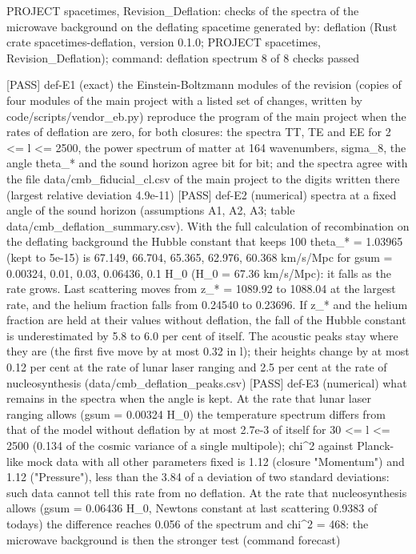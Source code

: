 \documentclass[
  10pt,
]{article}
\newenvironment{Shaded}{}{}
\newcommand{\NormalTok}[1]{#1}
\begin{document}
\begin{Shaded}
\begin{Highlighting}[]
\NormalTok{PROJECT spacetimes, Revision\_Deflation: checks of the spectra of the microwave background on the deflating spacetime}
\NormalTok{generated by: deflation (Rust crate spacetimes{-}deflation, version 0.1.0; PROJECT spacetimes, Revision\_Deflation); command: deflation spectrum}
\NormalTok{8 of 8 checks passed}

\NormalTok{[PASS] def{-}E1  (exact) the Einstein{-}Boltzmann modules of the revision (copies of four modules of the main project with a listed set of changes, written by code/scripts/vendor\_eb.py) reproduce the program of the main project when the rates of deflation are zero, for both closures: the spectra TT, TE and EE for 2 \textless{}= l \textless{}= 2500, the power spectrum of matter at 164 wavenumbers, sigma\_8, the angle theta\_* and the sound horizon agree bit for bit; and the spectra agree with the file data/cmb\_fiducial\_cl.csv of the main project to the digits written there (largest relative deviation 4.9e{-}11)}
\NormalTok{[PASS] def{-}E2  (numerical) spectra at a fixed angle of the sound horizon (assumptions A1, A2, A3; table data/cmb\_deflation\_summary.csv). With the full calculation of recombination on the deflating background the Hubble constant that keeps 100 theta\_* = 1.03965 (kept to 5e{-}15) is 67.149, 66.704, 65.365, 62.976, 60.368 km/s/Mpc for gsum = 0.00324, 0.01, 0.03, 0.06436, 0.1 H\_0 (H\_0 = 67.36 km/s/Mpc): it falls as the rate grows. Last scattering moves from z\_* = 1089.92 to 1088.04 at the largest rate, and the helium fraction falls from 0.24540 to 0.23696. If z\_* and the helium fraction are held at their values without deflation, the fall of the Hubble constant is underestimated by 5.8 to 6.0 per cent of itself. The acoustic peaks stay where they are (the first five move by at most 0.32 in l); their heights change by at most 0.12 per cent at the rate of lunar laser ranging and 2.5 per cent at the rate of nucleosynthesis (data/cmb\_deflation\_peaks.csv)}
\NormalTok{[PASS] def{-}E3  (numerical) what remains in the spectra when the angle is kept. At the rate that lunar laser ranging allows (gsum = 0.00324 H\_0) the temperature spectrum differs from that of the model without deflation by at most 2.7e{-}3 of itself for 30 \textless{}= l \textless{}= 2500 (0.134 of the cosmic variance of a single multipole); chi\^{}2 against Planck{-}like mock data with all other parameters fixed is 1.12 (closure "Momentum") and 1.12 ("Pressure"), less than the 3.84 of a deviation of two standard deviations: such data cannot tell this rate from no deflation. At the rate that nucleosynthesis allows (gsum = 0.06436 H\_0, Newton\textquotesingle{}s constant at last scattering 0.9383 of today\textquotesingle{}s) the difference reaches 0.056 of the spectrum and chi\^{}2 = 468: the microwave background is then the stronger test (command \textasciigrave{}forecast\textasciigrave{})}

\end{Highlighting}
\end{Shaded}
\end{document}
